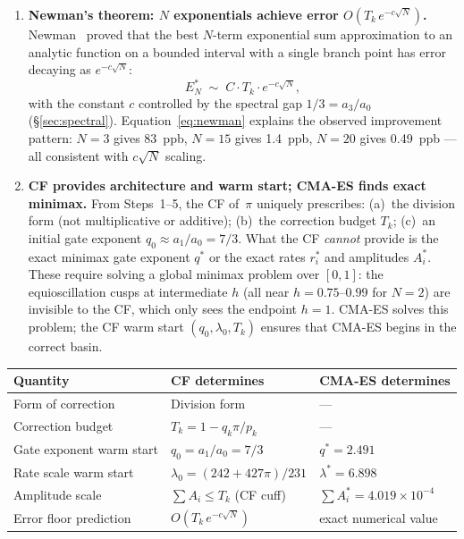\documentclass[12pt]{article}
\begin{document}
\begin{enumerate}
\item[\textbf{Step 5.}] \textbf{Newman's theorem: $N$ exponentials achieve error $O(T_k\,e^{-c\sqrt{N}})$.}
Newman~\cite{newman1964} proved that the best $N$-term exponential sum approximation to an analytic function
on a bounded interval with a single branch point has error decaying as $e^{-c\sqrt{N}}$:
\begin{equation}\label{eq:newman}
E^*_N \;\sim\; C\cdot T_k\cdot e^{-c\sqrt{N}},
\end{equation}
with the constant $c$ controlled by the spectral gap $1/3 = a_3/a_0$ (\S\ref{sec:spectral}).
Equation~\eqref{eq:newman} explains the observed improvement pattern: $N=3$ gives 83~ppb,
$N=15$ gives 1.4~ppb, $N=20$ gives 0.49~ppb --- all consistent with $c\sqrt{N}$ scaling.

\item[\textbf{Step 6.}] \textbf{CF provides architecture and warm start; CMA-ES finds exact minimax.}
From Steps~1--5, the CF of~$\pi$ uniquely prescribes:
(a)~the division form (not multiplicative or additive);
(b)~the correction budget $T_k$;
(c)~an initial gate exponent $q_0 \approx a_1/a_0 = 7/3$.
What the CF \emph{cannot} provide is the exact minimax gate exponent $q^*$ or the exact rates
$r_i^*$ and amplitudes $A_i^*$.  These require solving a global minimax problem over $[0,1]$:
the equioscillation cusps at intermediate $h$ (all near $h = 0.75$--$0.99$ for $N=2$) are invisible
to the CF, which only sees the endpoint $h=1$.  CMA-ES solves this problem; the CF warm start
$(q_0, \lambda_0, T_k)$ ensures that CMA-ES begins in the correct basin.
\end{enumerate}

\begin{center}
\small\renewcommand{\arraystretch}{1.2}
\begin{tabular}{lll}
\toprule
Quantity & CF determines & CMA-ES determines \\
\midrule
Form of correction & Division form & --- \\
Correction budget & $T_k = 1-q_k\pi/p_k$ & --- \\
Gate exponent warm start & $q_0 = a_1/a_0 = 7/3$ & $q^* = 2.491$ \\
Rate scale warm start & $\lambda_0 = (242+427\pi)/231$ & $\lambda^* = 6.898$ \\
Amplitude scale & $\sum A_i \le T_k$ (CF cuff) & $\sum A_i^* = 4.019\times10^{-4}$ \\
Error floor prediction & $O(T_k\,e^{-c\sqrt{N}})$ & exact numerical value \\
\bottomrule
\end{tabular}
\end{center}
\end{document}
